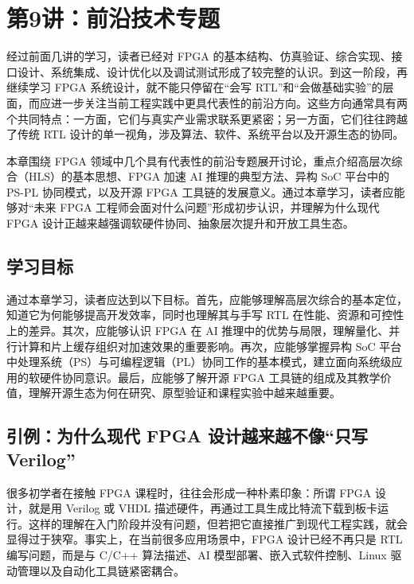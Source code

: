 \chapter{第9讲：前沿技术专题}\label{ux7b2c9ux8bb2ux524dux6cbfux6280ux672fux4e13ux9898}

经过前面几讲的学习，读者已经对 FPGA
的基本结构、仿真验证、综合实现、接口设计、系统集成、设计优化以及调试测试形成了较完整的认识。到这一阶段，再继续学习
FPGA 系统设计，就不能只停留在``会写
RTL''和``会做基础实验''的层面，而应进一步关注当前工程实践中更具代表性的前沿方向。这些方向通常具有两个共同特点：一方面，它们与真实产业需求联系更紧密；另一方面，它们往往跨越了传统
RTL 设计的单一视角，涉及算法、软件、系统平台以及开源生态的协同。

本章围绕 FPGA
领域中几个具有代表性的前沿专题展开讨论，重点介绍高层次综合（HLS）的基本思想、FPGA
加速 AI 推理的典型方法、异构 SoC 平台中的 PS-PL 协同模式，以及开源 FPGA
工具链的发展意义。通过本章学习，读者应能够对``未来 FPGA
工程师会面对什么问题''形成初步认识，并理解为什么现代 FPGA
设计正越来越强调软硬件协同、抽象层次提升和开放工具生态。

\section{学习目标}\label{ux5b66ux4e60ux76eeux6807}

通过本章学习，读者应达到以下目标。首先，应能够理解高层次综合的基本定位，知道它为何能够提高开发效率，同时也理解其与手写
RTL 在性能、资源和可控性上的差异。其次，应能够认识 FPGA 在 AI
推理中的优势与局限，理解量化、并行计算和片上缓存组织对加速效果的重要影响。再次，应能够掌握异构
SoC
平台中处理系统（PS）与可编程逻辑（PL）协同工作的基本模式，建立面向系统级应用的软硬件协同意识。最后，应能够了解开源
FPGA
工具链的组成及其教学价值，理解开源生态为何在研究、原型验证和课程实验中越来越重要。

\section{引例：为什么现代 FPGA 设计越来越不像``只写
Verilog''}\label{ux5f15ux4f8bux4e3aux4ec0ux4e48ux73b0ux4ee3-fpga-ux8bbeux8ba1ux8d8aux6765ux8d8aux4e0dux50cfux53eaux5199-verilog}

很多初学者在接触 FPGA 课程时，往往会形成一种朴素印象：所谓 FPGA
设计，就是用 Verilog 或 VHDL
描述硬件，再通过工具生成比特流下载到板卡运行。这样的理解在入门阶段并没有问题，但若把它直接推广到现代工程实践，就会显得过于狭窄。事实上，在当前很多应用场景中，FPGA
设计已经不再只是 RTL 编写问题，而是与 C/C++ 算法描述、AI
模型部署、嵌入式软件控制、Linux 驱动管理以及自动化工具链紧密耦合。

